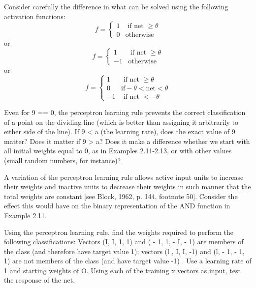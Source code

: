 \begin{problem}[12]
 Consider carefully the difference in what can be solved using the following activation
functions:
\[f=\left\{ \begin{array}{ll}1 & \text{ if net } \geq \theta \\ 0 & \text{otherwise} \end{array}\right.\]
or
\[f=\left\{ \begin{array}{ll}1 & \text{ if net } \geq \theta \\ -1 & \text{otherwise} \end{array}\right.\]
or
\[f=\left\{ \begin{array}{ll}1 & \text{ if net } \geq \theta \\ 0 & \text{if} -\theta < \text{net} < \theta \\ -1 & \text{ if net } < -\theta\end{array}\right.\]
\solution

\end{problem}

\begin{problem}[13]
 Even for 9 == 0, the perceptron learning rule prevents the correct classification of a
point on the dividing line (which is better than assigning it arbitrarily to either side
of the line). If 9 < a (the learning rate), does the exact value of 9 matter? Does it
matter if 9 > a? Does it make a difference whether we start with all initial weights
equal to 0, as in Examples 2.11-2.13, or with other values (small random numbers,
for instance)?

\solution

\end{problem}

\begin{problem}[14]
 A variation of the perceptron learning rule allows active input units to increase their
weights and inactive units to decrease their weights in such manner that the total
weights are constant [see Block, 1962, p. 144, footnote 50]. Consider the effect this
would have on the binary representation of the AND function in Example 2.11.

\solution

\end{problem}

\begin{problem}[15]
 Using the perceptron learning rule, find the weights required to perform the following
classifications: Vectors (I, I, 1, 1) and ( - 1, 1, - I, - 1) are members of the class
(and therefore have target value 1); vectors (l , I, I, -1) and (l, - 1, - 1, 1) are not
members of the class (and have target value -1) . Use a learning rate of 1 and starting
weights of O. Using each of the training x vectors as input, test the response of the
net.

\solution

\end{problem}



